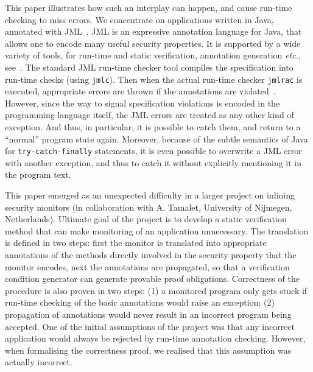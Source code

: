 \documentclass[]{llncs}
\begin{document}
This paper illustrates how such an interplay can happen, and cause
run-time checking to miss errors. We concentrate on applications
written in Java, annotated with JML~\cite{LeavensBR99}. JML is an
expressive annotation language for Java, that allows one to encode
many useful security properties. It is supported by a wide variety of
tools, for run-time and static verification, annotation generation
\emph{etc.}, see~\cite{BurdyCCEKLLP03}. The standard JML run-time
checker tool compiles the specification into run-time checks (using
\texttt{jmlc}). Then when the actual run-time checker \texttt{jmlrac}
is executed, appropriate errors are thrown if the annotations are
violated~\cite{Cheon03}. However, since the way to signal
specification violations is encoded in the programming language
itself, the JML errors are treated as any other kind of exception. And
thus, in particular, it is possible to catch them, and return to a
``normal'' program state again. Moreover, because of the subtle
semantics of Java for
\texttt{try-catch-finally} statements, it is even possible to
overwrite a JML error with another exception, and thus to catch it
without explicitly mentioning it in the program text.

This paper emerged as an unexpected difficulty in a larger project on
inlining security monitors (in collaboration with A. Tamalet,
University of Nijmegen, Netherlands). Ultimate goal of the project is
to develop a static verification method that can make monitoring of an
application unnecessary. The translation is defined in two steps:
first the monitor is translated into appropriate annotations of the
methods directly involved in the security property that the monitor
encodes, next the annotations are propagated, so that a verification
condition generator can generate provable proof
obligations. Correctness of the procedure is also proven in two steps:
(1) a monitored program only gets stuck if run-time checking of the
basic annotations would raise an exception; (2) propagation of
annotations would never result in an incorrect program being
accepted. One of the initial assumptions of the project was that any
incorrect application would always be rejected by run-time annotation
checking. However, when formalising the correctness proof, we realised
that this assumption was actually incorrect.
\end{document}
